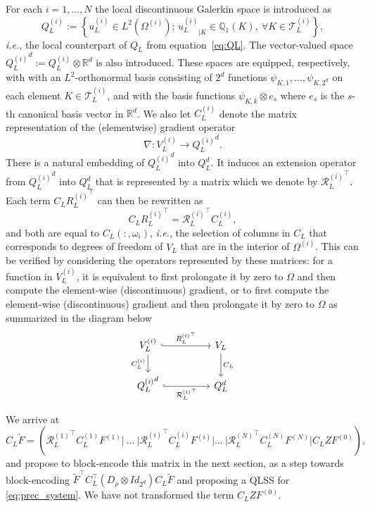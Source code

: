 \documentclass[onefignum,onetabnum]{siamart251216}
\begin{document}
For each $i = 1, \dots, N$ the local discontinuous Galerkin space is introduced as 
\[
Q_L^{(i)} := \left\{u_L^{(i)} \in L^2(\Omega^{(i)});\, {u_L^{(i)}}_{|K} \in \mathbb Q_1(K), \ \forall K \in \mathcal{T}_L^{(i)} \right\},
\]
\textit{i.e.}, the local counterpart of $Q_L$ from equation~\eqref{eq:QL}. The vector-valued space ${Q_L^{(i)}}^d := Q_L^{(i)} \otimes \mathbb{R}^d$ is also introduced. These spaces are equipped, respectively, with with an $L^2$-orthonormal basis consisting of $2^d$ functions
$\psi_{K,1}, \dots, \psi_{K,2^d}$ on each element $K \in \mathcal{T}_L^{(i)}$, and with the basis functions $\psi_{K,k} \otimes e_s $ where $e_s$ is the $s$-th canonical basis vector in $\mathbb R^{d}$.  We also let $C_L^{(i)}$ denote the matrix representation of the (elementwise) gradient operator
\[
\nabla : V_L^{(i)} \to {Q_L^{(i)}}^d.
\]
There is a natural embedding of ${Q_L^{(i)}}^d$ into $Q_L^{d}$. It induces an extension operator from ${Q_L^{(i)}}^d$ into $Q_L^{d}$ that is represented by a matrix which we denote by ${\mathcal{R}_L^{(i)}}^\top$. Each term $C_L {R_L^{(i)}}^\top$ can then be rewritten as 
\begin{equation}
C_L {R_L^{(i)}}^\top = {\mathcal{R}_L^{(i)}}^\top C_L^{(i)},
\label{eq:switch_gradient}
\end{equation}
and both are equal to $C_L(:,\omega_i)$, \textit{i.e.}, the selection of columns in $C_L$ that corresponds to degrees of freedom of $V_L$ that are in the interior of $\Omega^{(i)}$. This can be verified by considering the operators represented by these matrices: for a function in $ V_L^{(i)}$, it is equivalent to first prolongate it by zero to $\Omega$ and then compute the element-wise (discontinuous) gradient, or to first compute the element-wise (discontinuous) gradient and then prolongate it by zero to $\Omega$ as summarized in the diagram below 
\[
\begin{tikzcd}[row sep=normal, column sep=huge]
V_L^{(i)} \arrow[r,hook, "{ {R_L^{(i)}}^\top }"] \arrow[d, "C_L^{(i)}"'] & V_L \arrow[d, "C_L"] \\
{Q_L^{(i)}}^d \arrow[r,hook, "{ {\mathcal{R}_L^{(i)}}^\top }"'] & Q_L^d
\end{tikzcd}
\]

We arrive at
\begin{equation}
C_L \tilde{F} = \left( {\mathcal{R}_L^{(1)}}^\top C_L^{(1)} F^{(1)}  |~\dots~| {\mathcal{R}_L^{(i)}}^\top C_L^{(i)} F^{(i)} | \dots~| {\mathcal{R}_L^{(N)}}^\top C_L^{(N)} F^{(N)} |C_L Z F^{(0)} \right),
\label{eq:precond_gradient}
\end{equation}
and propose to block-encode this matrix in the next section, as a step towards block-encoding $\tilde{F}^\top C_L^\top (D_{\rho} \otimes Id_{2^d}) C_L \tilde{F}$ and proposing a QLSS for  \eqref{eq:prec_system}. We have not transformed the term $C_L Z F^{(0)}$.
\end{document}
